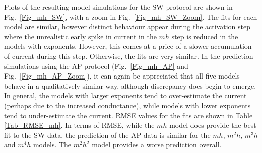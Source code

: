 \documentclass[11pt,a4paper,oneside]{article}
\begin{document}
Plots of the resulting model simulations for the SW protocol are shown in Fig.~\ref{Fig_mh_SW}, with a zoom in Fig.~\ref{Fig_mh_SW_Zoom}. The fits for each model are similar, however distinct behaviour appear during the activation step where the unrealistic early spike in current in the $mh$ step is reduced in the models with exponents. However, this comes at a price of a slower accumulation of current during this step. Otherwise, the fits are very similar. In the prediction simulations using the AP protocol (Fig.~\ref{Fig_mh_AP} and Fig.~\ref{Fig_mh_AP_Zoom}), it can again be appreciated that all five models behave in a qualitatively similar way, although discrepancy does begin to emerge. In general, the models with larger exponents tend to over-estimate the current (perhaps due to the increased conductance), while models with lower exponents tend to under-estimate the current. RMSE values for the fits are shown in Table \ref{Tab_RMSE_mh}. In terms of RMSE, while the $mh$ model does provide the best fit to the SW data, the prediction of the AP data is similar for the $mh$, $m^2h$, $m^3h$ and $m^4h$ models. The $m^2h^2$ model provides a worse prediction overall.

\begin{table}
\caption{Fitted $mh$ model parameters}
\centering
{}
\label{Tab_Fitted_Parameters_mh}
\end{table}
\end{document}
